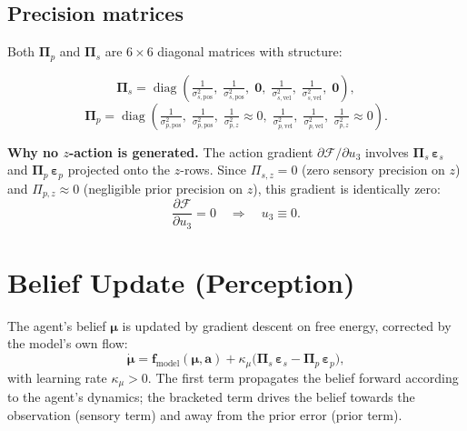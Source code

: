 \documentclass[11pt, a4paper]{article}
\newcommand{\vect}[1]{\bm{#1}}
\newcommand{\mat}[1]{\mathbf{#1}}
\newcommand{\FE}{\mathcal{F}}
\newcommand{\Pip}{\mat{\Pi}_p}
\newcommand{\Pis}{\mat{\Pi}_s}
\newcommand{\epsp}{\vect{\varepsilon}_p}
\newcommand{\epss}{\vect{\varepsilon}_s}
\begin{document}
\subsection{Precision matrices}
Both $\Pip$ and $\Pis$ are $6\times 6$ diagonal matrices with structure:

\begin{equation}
  \Pis = \operatorname{diag}\!\left(
    \tfrac{1}{\sigma_{s,\text{pos}}^2},\;
    \tfrac{1}{\sigma_{s,\text{pos}}^2},\;
    \mathbf{0},\;
    \tfrac{1}{\sigma_{s,\text{vel}}^2},\;
    \tfrac{1}{\sigma_{s,\text{vel}}^2},\;
    \mathbf{0}
  \right),
\end{equation}
\begin{equation}
  \Pip = \operatorname{diag}\!\left(
    \tfrac{1}{\sigma_{p,\text{pos}}^2},\;
    \tfrac{1}{\sigma_{p,\text{pos}}^2},\;
    \tfrac{1}{\sigma_{p,z}^2}\!\approx\!0,\;
    \tfrac{1}{\sigma_{p,\text{vel}}^2},\;
    \tfrac{1}{\sigma_{p,\text{vel}}^2},\;
    \tfrac{1}{\sigma_{p,z}^2}\!\approx\!0
  \right).
\end{equation}

\begin{keybox}
\textbf{Why no $z$-action is generated.}
The action gradient
$\partial\FE/\partial u_3$
involves $\Pis\,\epss$ and $\Pip\,\epsp$ projected onto the $z$-rows.
Since $\Pi_{s,z} = 0$ (zero sensory precision on $z$) and $\Pi_{p,z}\approx 0$
(negligible prior precision on $z$), this gradient is identically zero:
\[
  \frac{\partial \FE}{\partial u_3} = 0 \quad\Rightarrow\quad u_3 \equiv 0.
\]
\end{keybox}

\section{Belief Update (Perception)}

The agent's belief $\vect{\mu}$ is updated by gradient descent on free energy,
corrected by the model's own flow:
\begin{equation}
  \dot{\vect{\mu}} = \vect{f}_{\text{model}}(\vect{\mu}, \vect{a})
                    + \kappa_\mu \bigl(\Pis\,\epss - \Pip\,\epsp\bigr),
\end{equation}
with learning rate $\kappa_\mu > 0$. The first term propagates the belief
forward according to the agent's dynamics; the bracketed term drives the
belief towards the observation (sensory term) and away from the prior error
(prior term).
\end{document}
